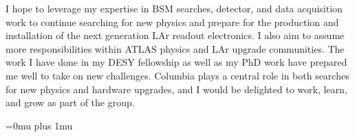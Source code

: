 \documentclass[a4paper]{article}
\begin{document}

I hope to leverage my expertise in BSM searches, detector, and data acquisition work to continue searching for new physics and prepare for
the production and installation of the next generation LAr readout electronics.
I also aim to assume more responsibilities within ATLAS physics and LAr upgrade communities. The work I have done
in my DESY fellowship as well as my PhD work have prepared me well to take on new challenges.
Columbia plays a central role in both searches for new physics and hardware upgrades, and I would be delighted to work,
learn, and grow as part of the group.




\Urlmuskip=0mu plus 1mu\relax
{%
\fontsize{11}{14}
\selectfont
}{}

\end{document}
